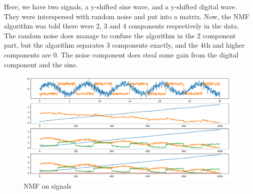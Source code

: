 \documentclass{article}
\begin{document}
Here, we have two signals, a y-shifted sine wave, and a y-shifted digital wave. They were interspersed with random noise and put into a matrix. Now, the NMF algorithm was told there were 2, 3 and 4 components respectively in the data. The random noise does manage to confuse the algorithm in the 2 component part, but the algorithm separates 3 components exactly, and the 4th and higher components are 0. The noise component does steal some gain from the digital component and the sine.

\begin{figure}[H]
\includegraphics[width=\linewidth]{Images/nmf.png}
\centering
\caption{NMF on signals}
\end{figure}
\end{document}
